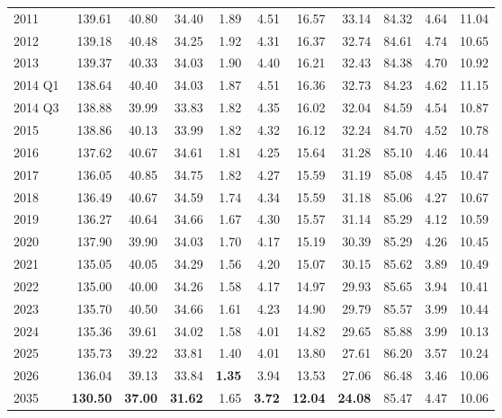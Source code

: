 \documentclass[preprint,12pt]{elsarticle}
\begin{document}
\begin{table}[htbp]
{\begin{minipage}{\textwidth}
\begin{tabular}{l|r|rrrr|rr|rrr}
2011 & 139.61 & 40.80 & 34.40 & 1.89 & 4.51 & 16.57 & 33.14 & 84.32 & 4.64 & 11.04 \\
2012 & 139.18 & 40.48 & 34.25 & 1.92 & 4.31 & 16.37 & 32.74 & 84.61 & 4.74 & 10.65 \\
2013 & 139.37 & 40.33 & 34.03 & 1.90 & 4.40 & 16.21 & 32.43 & 84.38 & 4.70 & 10.92 \\
2014 {\tiny Q1} & 138.64 & 40.40 & 34.03 & 1.87 & 4.51 & 16.36 & 32.73 & 84.23 & 4.62 & 11.15 \\
2014 {\tiny Q3} & 138.88 & 39.99 & 33.83 & 1.82 & 4.35 & 16.02 & 32.04 & 84.59 & 4.54 & 10.87 \\
2015 & 138.86 & 40.13 & 33.99 & 1.82 & 4.32 & 16.12 & 32.24 & 84.70 & 4.52 & 10.78 \\
2016 & 137.62 & 40.67 & 34.61 & 1.81 & 4.25 & 15.64 & 31.28 & 85.10 & 4.46 & 10.44 \\
2017 & 136.05 & 40.85 & 34.75 & 1.82 & 4.27 & 15.59 & 31.19 & 85.08 & 4.45 & 10.47 \\
2018 & 136.49 & 40.67 & 34.59 & 1.74 & 4.34 & 15.59 & 31.18 & 85.06 & 4.27 & 10.67 \\
2019 & 136.27 & 40.64 & 34.66 & 1.67 & 4.30 & 15.57 & 31.14 & 85.29 & 4.12 & 10.59 \\
2020 & 137.90 & 39.90 & 34.03 & 1.70 & 4.17 & 15.19 & 30.39 & 85.29 & 4.26 & 10.45 \\
2021 & 135.05 & 40.05 & 34.29 & 1.56 & 4.20 & 15.07 & 30.15 & 85.62 & 3.89 & 10.49 \\
2022 & 135.00 & 40.00 & 34.26 & 1.58 & 4.17 & 14.97 & 29.93 & 85.65 & 3.94 & 10.41 \\
2023 & 135.70 & 40.50 & 34.66 & 1.61 & 4.23 & 14.90 & 29.79 & 85.57 & 3.99 & 10.44 \\
2024 & 135.36 & 39.61 & 34.02 & 1.58 & 4.01 & 14.82 & 29.65 & 85.88 & 3.99 & 10.13 \\
2025 & 135.73 & 39.22 & 33.81 & 1.40 & 4.01 & 13.80 & 27.61 & 86.20 & 3.57 & 10.24 \\
2026 & 136.04 & 39.13 & 33.84 & \textbf{1.35} & 3.94 & 13.53 & 27.06 & 86.48 & 3.46 & 10.06 \\
2035 & \textbf{130.50} & \textbf{37.00} & \textbf{31.62} & 1.65 & \textbf{3.72} & \textbf{12.04} & \textbf{24.08} & 85.47 & 4.47 & 10.06 \\
\bottomrule
\end{tabular}

\end{minipage}%
}
\end{table}
\end{document}

